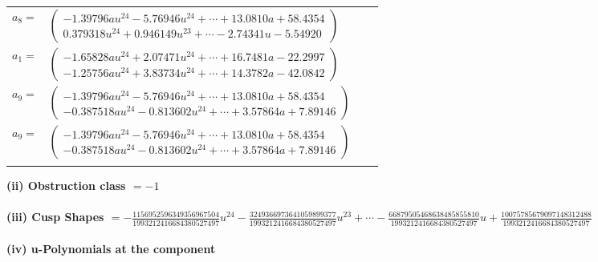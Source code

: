 \documentclass[1p]{elsarticle_modified}
\theoremstyle{definition}
\begin{document}
\begin{tabular}{m{7pt} m{180pt} m{7pt} m{180pt} }
\flushright $a_{8}=$&$\begin{pmatrix}-1.39796 a u^{24}-5.76946 u^{24}+\cdots+13.0810 a+58.4354\\0.379318 u^{24}+0.946149 u^{23}+\cdots-2.74341 u-5.54920\end{pmatrix}$ \\
\flushright $a_{1}=$&$\begin{pmatrix}-1.65828 a u^{24}+2.07471 u^{24}+\cdots+16.7481 a-22.2997\\-1.25756 a u^{24}+3.83734 u^{24}+\cdots+14.3782 a-42.0842\end{pmatrix}$ \\
\flushright $a_{9}=$&$\begin{pmatrix}-1.39796 a u^{24}-5.76946 u^{24}+\cdots+13.0810 a+58.4354\\-0.387518 a u^{24}-0.813602 u^{24}+\cdots+3.57864 a+7.89146\end{pmatrix}$\\ \flushright $a_{9}=$&$\begin{pmatrix}-1.39796 a u^{24}-5.76946 u^{24}+\cdots+13.0810 a+58.4354\\-0.387518 a u^{24}-0.813602 u^{24}+\cdots+3.57864 a+7.89146\end{pmatrix}$\\&\end{tabular}
\flushleft \textbf{(ii) Obstruction class $= -1$}\\~\\
\flushleft \textbf{(iii) Cusp Shapes $= -\frac{1156952596349356967504}{1993212416684380527497} u^{24}-\frac{3249366973641059899377}{1993212416684380527497} u^{23}+\cdots-\frac{66879505468638485855810}{1993212416684380527497} u+\frac{10075785679097148312488}{1993212416684380527497}$}\\~\\
\newpage\renewcommand{\arraystretch}{1}
\flushleft \textbf{(iv) u-Polynomials at the component}\newline \\
\end{document}
